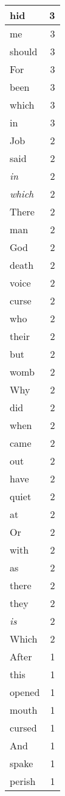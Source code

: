 \begin{center}
\begin{longtable}{l|r}
hid & 3\\ \hline 
me & 3\\ \hline 
should & 3\\ \hline 
For & 3\\ \hline 
been & 3\\ \hline 
which & 3\\ \hline 
in & 3\\ \hline 
Job & 2\\ \hline 
said & 2\\ \hline 
\emph{in} & 2\\ \hline 
\emph{which} & 2\\ \hline 
There & 2\\ \hline 
man & 2\\ \hline 
God & 2\\ \hline 
death & 2\\ \hline 
voice & 2\\ \hline 
curse & 2\\ \hline 
who & 2\\ \hline 
their & 2\\ \hline 
but & 2\\ \hline 
womb & 2\\ \hline 
Why & 2\\ \hline 
did & 2\\ \hline 
when & 2\\ \hline 
came & 2\\ \hline 
out & 2\\ \hline 
have & 2\\ \hline 
quiet & 2\\ \hline 
at & 2\\ \hline 
Or & 2\\ \hline 
with & 2\\ \hline 
as & 2\\ \hline 
there & 2\\ \hline 
they & 2\\ \hline 
\emph{is} & 2\\ \hline 
Which & 2\\ \hline 
After & 1\\ \hline 
this & 1\\ \hline 
opened & 1\\ \hline 
mouth & 1\\ \hline 
cursed & 1\\ \hline 
And & 1\\ \hline 
spake & 1\\ \hline 
perish & 1\\ \hline 

\end{longtable}
\end{center}
